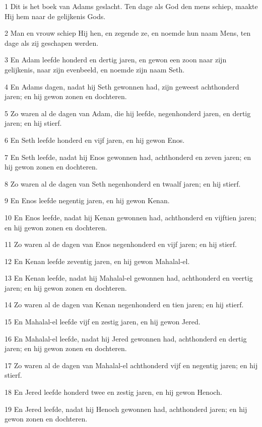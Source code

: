 \par 1 Dit is het boek van Adams geslacht. Ten dage als God den mens schiep, maakte Hij hem naar de gelijkenis Gods.
\par 2 Man en vrouw schiep Hij hen, en zegende ze, en noemde hun naam Mens, ten dage als zij geschapen werden.
\par 3 En Adam leefde honderd en dertig jaren, en gewon een zoon naar zijn gelijkenis, naar zijn evenbeeld, en noemde zijn naam Seth.
\par 4 En Adams dagen, nadat hij Seth gewonnen had, zijn geweest achthonderd jaren; en hij gewon zonen en dochteren.
\par 5 Zo waren al de dagen van Adam, die hij leefde, negenhonderd jaren, en dertig jaren; en hij stierf.
\par 6 En Seth leefde honderd en vijf jaren, en hij gewon Enos.
\par 7 En Seth leefde, nadat hij Enos gewonnen had, achthonderd en zeven jaren; en hij gewon zonen en dochteren.
\par 8 Zo waren al de dagen van Seth negenhonderd en twaalf jaren; en hij stierf.
\par 9 En Enos leefde negentig jaren, en hij gewon Kenan.
\par 10 En Enos leefde, nadat hij Kenan gewonnen had, achthonderd en vijftien jaren; en hij gewon zonen en dochteren.
\par 11 Zo waren al de dagen van Enos negenhonderd en vijf jaren; en hij stierf.
\par 12 En Kenan leefde zeventig jaren, en hij gewon Mahalal-el.
\par 13 En Kenan leefde, nadat hij Mahalal-el gewonnen had, achthonderd en veertig jaren; en hij gewon zonen en dochteren.
\par 14 Zo waren al de dagen van Kenan negenhonderd en tien jaren; en hij stierf.
\par 15 En Mahalal-el leefde vijf en zestig jaren, en hij gewon Jered.
\par 16 En Mahalal-el leefde, nadat hij Jered gewonnen had, achthonderd en dertig jaren; en hij gewon zonen en dochteren.
\par 17 Zo waren al de dagen van Mahalal-el achthonderd vijf en negentig jaren; en hij stierf.
\par 18 En Jered leefde honderd twee en zestig jaren, en hij gewon Henoch.
\par 19 En Jered leefde, nadat hij Henoch gewonnen had, achthonderd jaren; en hij gewon zonen en dochteren.
